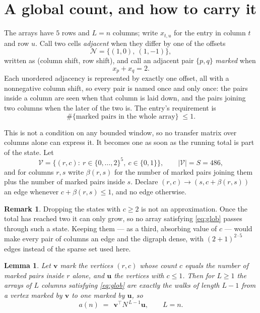 \documentclass[11pt,a4paper]{article}
\theoremstyle{plain}
\newtheorem{lemma}[theorem]{Lemma}
\theoremstyle{definition}
\newtheorem{remark}[theorem]{Remark}
\begin{document}
\section{A global count, and how to carry it}

The arrays have $5$ rows and $L=n$ columns; write $x_{t,u}$ for the entry in
column $t$ and row $u$. Call two cells \emph{adjacent} when they differ by one of the
offsets
\[
\mathcal N=\{(1,0),\ (1,-1)\},
\]
written as (column shift, row shift), and call an adjacent pair $\{p,q\}$
\emph{marked} when
\[
x_{p}+x_{q}=2 .
\]
Each unordered adjacency is represented by exactly one offset, all with a nonnegative column
shift, so every pair is named once and only once: the pairs inside a column are seen when
that column is laid down, and the pairs joining two columns when the later of the two is. The
entry's requirement is
\begin{equation}\label{eq:glob}
\#\{\text{marked pairs in the whole array}\}\;\le1.
\end{equation}

This is not a condition on any bounded window, so no transfer matrix over columns alone can
express it. It becomes one as soon as the running total is part of the state. Let
\[
\mathcal V=\bigl\{(r,c):\ r\in\{0,\dots,2\}^{5},\ c\in\{0,1\}\bigr\},
\qquad |\mathcal V|=S=486,
\]
and for columns $r,s$ write $\beta(r,s)$ for the number of marked pairs joining them plus the
number of marked pairs inside $s$. Declare $(r,c)\to(s,c+\beta(r,s))$ an edge whenever
$c+\beta(r,s)\le1$, and no edge otherwise.

\begin{remark}
Dropping the states with $c\ge2$ is not an approximation. Once the total has reached two it
can only grow, so no array satisfying \eqref{eq:glob} passes through such a state. Keeping
them --- as a third, absorbing value of $c$ --- would make every pair of columns an edge and
the digraph dense, with $(2+1)^{2\cdot5}$ edges instead of the sparse set used here.
\end{remark}

\begin{lemma}\label{lem:walk}
Let $\mathbf{v}$ mark the vertices $(r,c)$ whose count $c$ equals the number of marked pairs
inside $r$ alone, and $\mathbf{u}$ the vertices with $c\le1$. Then for $L\ge1$ the arrays
of $L$ columns satisfying \eqref{eq:glob} are exactly the walks of length $L-1$ from a
vertex marked by $\mathbf{v}$ to one marked by $\mathbf{u}$, so
\[
a(n)\;=\;\,\mathbf{v}^{\!\top}N^{\,L-1}\mathbf{u},\qquad L=n .
\]
\end{lemma}
\end{document}
